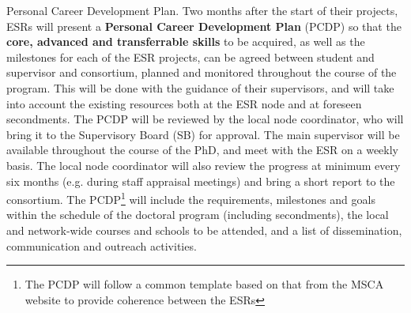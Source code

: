 
\noindent \color{blue}Personal Career Development Plan. \color{black}
Two months after the start of their projects, ESRs will present a \textbf{Personal Career Development Plan} 
(PCDP) so that the \textbf{core, advanced and transferrable skills} to be acquired,
as well as the milestones for each of the ESR projects,
can be agreed between student and supervisor and consortium, 
planned and monitored throughout the course of the program. 
This will be done with the guidance of their supervisors, and will take into account the 
existing resources both at the ESR node and at foreseen secondments. The PCDP will be reviewed by the local node coordinator, who will bring it to the
Supervisory Board (SB) for approval. The main supervisor will be available throughout the 
course of the PhD, and meet with the ESR on a weekly basis. 
The local node coordinator will also review the progress
at minimum every six months (e.g. during staff appraisal meetings) and bring a short report to the consortium. 
The PCDP\footnote{The \acronym PCDP will follow a common template based on that
from the MSCA website to provide coherence between the ESRs}
will include
the requirements, milestones and goals within the schedule of the doctoral program (including secondments),
the local and network-wide courses and schools to be attended, and
a list of dissemination, communication and outreach activities. 




